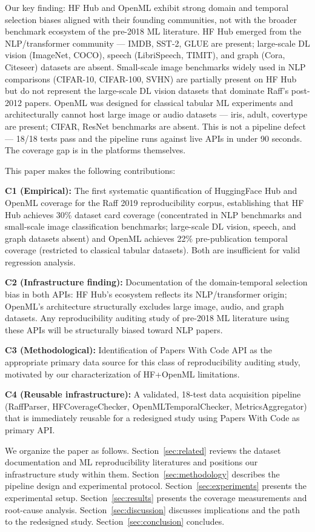 Our key finding: HF Hub and OpenML exhibit strong domain and temporal selection biases aligned with their founding communities, not with the broader benchmark ecosystem of the pre-2018 ML literature. HF Hub emerged from the NLP/transformer community --- IMDB, SST-2, GLUE are present; large-scale DL vision (ImageNet, COCO), speech (LibriSpeech, TIMIT), and graph (Cora, Citeseer) datasets are absent. Small-scale image benchmarks widely used in NLP comparisons (CIFAR-10, CIFAR-100, SVHN) are partially present on HF Hub but do not represent the large-scale DL vision datasets that dominate Raff's post-2012 papers. OpenML was designed for classical tabular ML experiments and architecturally cannot host large image or audio datasets --- iris, adult, covertype are present; CIFAR, ResNet benchmarks are absent. This is not a pipeline defect --- 18/18 tests pass and the pipeline runs against live APIs in under 90 seconds. The coverage gap is in the platforms themselves.

This paper makes the following contributions:

\textbf{C1 (Empirical):} The first systematic quantification of HuggingFace Hub and OpenML coverage for the Raff 2019 reproducibility corpus, establishing that HF Hub achieves 30\% dataset card coverage (concentrated in NLP benchmarks and small-scale image classification benchmarks; large-scale DL vision, speech, and graph datasets absent) and OpenML achieves 22\% pre-publication temporal coverage (restricted to classical tabular datasets). Both are insufficient for valid regression analysis.

\textbf{C2 (Infrastructure finding):} Documentation of the domain-temporal selection bias in both APIs: HF Hub's ecosystem reflects its NLP/transformer origin; OpenML's architecture structurally excludes large image, audio, and graph datasets. Any reproducibility auditing study of pre-2018 ML literature using these APIs will be structurally biased toward NLP papers.

\textbf{C3 (Methodological):} Identification of Papers With Code API as the appropriate primary data source for this class of reproducibility auditing study, motivated by our characterization of HF+OpenML limitations.

\textbf{C4 (Reusable infrastructure):} A validated, 18-test data acquisition pipeline (RaffParser, HFCoverageChecker, OpenMLTemporalChecker, MetricsAggregator) that is immediately reusable for a redesigned study using Papers With Code as primary API.

We organize the paper as follows. Section~\ref{sec:related} reviews the dataset documentation and ML reproducibility literatures and positions our infrastructure study within them. Section~\ref{sec:methodology} describes the pipeline design and experimental protocol. Section~\ref{sec:experiments} presents the experimental setup. Section~\ref{sec:results} presents the coverage measurements and root-cause analysis. Section~\ref{sec:discussion} discusses implications and the path to the redesigned study. Section~\ref{sec:conclusion} concludes.
